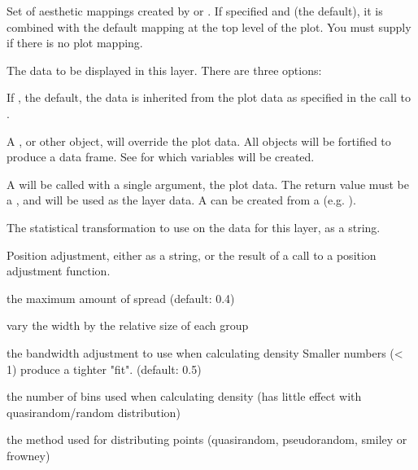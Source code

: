 \documentclass[a4paper]{book}
\begin{document}
\begin{Arguments}
\begin{ldescription}
\item[\code{mapping}] Set of aesthetic mappings created by  or
. If specified and  (the
default), it is combined with the default mapping at the top level of the
plot. You must supply  if there is no plot mapping.

\item[\code{data}] The data to be displayed in this layer. There are three
options:

If , the default, the data is inherited from the plot
data as specified in the call to .

A , or other object, will override the plot
data. All objects will be fortified to produce a data frame. See
 for which variables will be created.

A  will be called with a single argument,
the plot data. The return value must be a , and
will be used as the layer data. A  can be created
from a  (e.g. ).

\item[\code{stat}] The statistical transformation to use on the data for this
layer, as a string.

\item[\code{position}] Position adjustment, either as a string, or the result of
a call to a position adjustment function.

\item[\code{width}] the maximum amount of spread (default: 0.4)

\item[\code{varwidth}] vary the width by the relative size of each group

\item[\code{bandwidth}] the bandwidth adjustment to use when calculating density
Smaller numbers (< 1) produce a tighter "fit". (default: 0.5)

\item[\code{nbins}] the number of bins used when calculating density (has little effect with quasirandom/random distribution)

\item[\code{method}] the method used for distributing points (quasirandom, pseudorandom, smiley or frowney)


\end{ldescription}
\end{Arguments}
\end{document}
